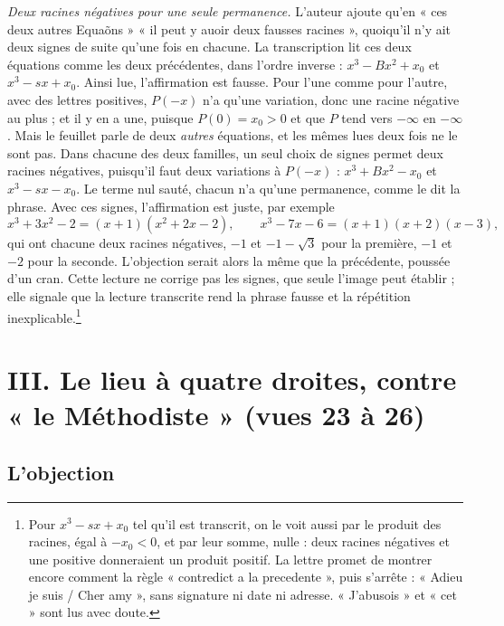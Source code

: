 \documentclass[11pt,a4paper]{article}
\begin{document}
\emph{Deux racines négatives pour une seule permanence.} L'auteur ajoute
qu'en « ces deux autres Equaõns » « il peut y auoir deux fausses racines »,
quoiqu'il n'y ait deux signes de suite qu'une fois en chacune. La
transcription lit ces deux équations comme les deux précédentes, dans l'ordre
inverse : \(x^3-Bx^2+x_0\) et \(x^3-sx+x_0\). Ainsi lue, l'affirmation est
fausse. Pour l'une comme pour l'autre, avec des lettres positives, \(P(-x)\) n'a
qu'une variation, donc une racine négative au plus ; et il y en a une, puisque
\(P(0)=x_0>0\) et que \(P\) tend vers \(-\infty\) en \(-\infty\). Mais le
feuillet parle de deux \emph{autres} équations, et les mêmes lues deux fois ne
le sont pas. Dans chacune des deux familles, un seul choix de signes permet
deux racines négatives, puisqu'il faut deux variations à \(P(-x)\) :
\(x^3+Bx^2-x_0\) et \(x^3-sx-x_0\). Le terme nul sauté, chacun n'a qu'une
permanence, comme le dit la phrase. Avec ces signes,
l'affirmation est juste, par exemple
\[
x^3+3x^2-2=(x+1)(x^2+2x-2),\qquad x^3-7x-6=(x+1)(x+2)(x-3),
\]
qui ont chacune deux racines négatives, \(-1\) et \(-1-\sqrt3\) pour la
première, \(-1\) et \(-2\) pour la seconde. L'objection serait alors la même que
la précédente, poussée d'un cran. Cette lecture ne corrige pas les signes, que
seule l'image peut établir ; elle signale que la lecture transcrite rend la
phrase fausse et la répétition inexplicable.\footnote{Pour
\(x^3-sx+x_0\) tel qu'il est transcrit, on le voit aussi par le produit des
racines, égal à \(-x_0<0\), et par leur somme, nulle : deux racines négatives
et une positive donneraient un produit positif. La lettre promet de montrer
encore comment la règle « contredict a la precedente », puis s'arrête :
« Adieu je suis / Cher amy », sans signature ni date ni adresse. « J'abusois »
et « cet » sont lus avec doute.}

\section*{III. Le lieu à quatre droites, contre « le Méthodiste » (vues 23 à 26)}

\subsection*{L'objection}
\end{document}
